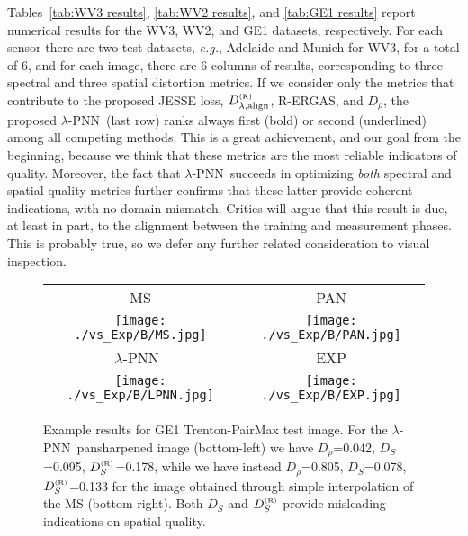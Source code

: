\documentclass[journal]{IEEEtran}
\newcommand{\DLa}{D^{_{\rm (K)}}_{\lambda, \rm align}}
\newcommand{\DR} {D_{\rho}}
\newcommand{\DS} {D_{S}}
\newcommand{\DSR}{D^{_{\rm (R)}}_S}
\newcommand{\LPNN}  {$\lambda$-PNN}
\begin{document}
Tables~\ref{tab:WV3 results}, \ref{tab:WV2 results}, and \ref{tab:GE1 results} report numerical results for the WV3, WV2, and GE1 datasets, respectively.
For each sensor there are two test datasets, {\it e.g.}, Adelaide and Munich for WV3, for a total of 6, and
for each image, there are 6 columns of results, corresponding to three spectral and three spatial distortion metrics.
If we consider only the metrics that contribute to the proposed JESSE loss, $\DLa$, R-ERGAS, and $\DR$,
the proposed \LPNN\ (last row) ranks always first (bold) or second (underlined) among all competing methods.
This is a great achievement, and our goal from the beginning, because we think that these metrics are the most reliable indicators of quality.
Moreover, the fact that \LPNN\ succeeds in optimizing {\em both} spectral and spatial quality metrics
further confirms that these latter provide coherent indications, with no domain mismatch.
Critics will argue that this result is due, at least in part, to the alignment between the training and measurement phases.
This is probably true, so we defer any further related consideration to visual inspection.

\begin{figure}
\centering
\footnotesize
\setlength{\tabcolsep}{1mm}
\begin{tabular}{cc}
                                      MS          &                                         PAN      \\
\texttt{[image: ./vs\_Exp/B/MS.jpg]}   & \texttt{[image: ./vs\_Exp/B/PAN.jpg]} \\[2mm]
                                     \LPNN\       &                                         EXP      \\
\texttt{[image: ./vs\_Exp/B/LPNN.jpg]} & \texttt{[image: ./vs\_Exp/B/EXP.jpg]} \\
\end{tabular}
\caption{
Example results for GE1 Trenton-PairMax test image.
For the \LPNN\ pansharpened image (bottom-left) we have
$\DR$=0.042, $\DS$=0.095, $\DSR$=0.178, while we have instead
$\DR$=0.805, $\DS$=0.078, $\DSR$=0.133 for the image obtained through simple interpolation of the MS (bottom-right).
Both $\DS$ and $\DSR$ provide misleading indications on spatial quality.
}
\label{fig:EXP_example}
\end{figure}
\end{document}
